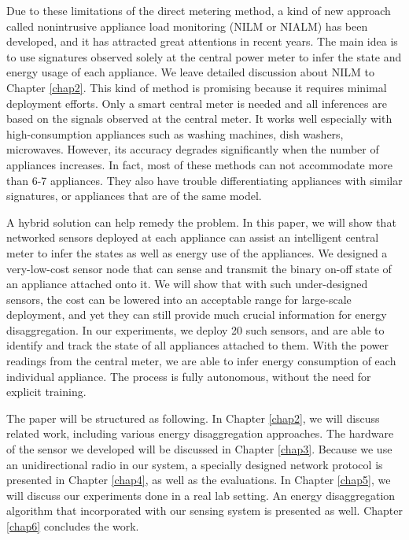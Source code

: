 Due to these limitations of the direct metering method, a kind of new approach called nonintrusive appliance load monitoring (NILM or NIALM) has been developed, and it has attracted great attentions in recent years. The main idea is to use signatures observed solely at the central power meter to infer the state and energy usage of each appliance. We leave detailed discussion about NILM to Chapter \ref{chap2}. This kind of method is promising because it requires minimal deployment efforts. Only a smart central meter is needed and all inferences are based on the signals observed at the central meter. It works well especially with high-consumption appliances such as washing machines, dish washers, microwaves. However, its accuracy degrades significantly when the number of appliances increases. In fact, most of these methods can not accommodate more than 6-7 appliances. They also have trouble differentiating appliances with similar signatures, or appliances that are of the same model. 

A hybrid solution can help remedy the problem. In this paper, we will show that networked sensors deployed at each appliance can assist an intelligent central meter to infer the states as well as energy use of the appliances. We designed a very-low-cost sensor node that can sense and transmit the binary on-off state of an appliance attached onto it. We will show that with such under-designed sensors, the cost can be lowered into an acceptable range for large-scale deployment, and yet they can still provide much crucial information for energy disaggregation. In our experiments, we deploy 20 such sensors, and are able to identify and track the state of all appliances attached to them. With the power readings from the central meter, we are able to infer energy consumption of each individual appliance. The process is fully autonomous, without the need for explicit training. 

The paper will be structured as following. In Chapter \ref{chap2}, we will discuss related work, including various energy disaggregation approaches. The hardware of the sensor we developed will be discussed in Chapter \ref{chap3}. Because we use an unidirectional radio  in our system, a specially designed network protocol is presented in Chapter \ref{chap4}, as well as the evaluations. In Chapter \ref{chap5}, we will discuss our experiments done in a real lab setting. An energy disaggregation algorithm that incorporated with our sensing system is presented as well. Chapter \ref{chap6} concludes the work. 


